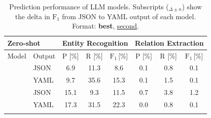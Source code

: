 



\begin{table}[tb]
  \centering
  \caption[Prediction performance of LLM models]{Prediction performance of LLM models. Subscripts (${}_{\Delta\pm n}$) show the delta in $\text{F}_1$ from JSON to YAML output of each model. Format: \textbf{best}, \underline{second}.}
  \label{tab:llmeval}
  \begin{tabular}{ll|ccc|ccc}
    \hline
    \multicolumn{2}{l|}{\textbf{Zero-shot}} &
    \multicolumn{3}{c|}{Entity Recognition} &
    \multicolumn{3}{c}{Relation Extraction} \\
    \hline
    Model & Output & P [\%] & R [\%] & $\text{F}_1$\,[\%] &
                     P [\%] & R [\%] & $\text{F}_1$\,[\%] \\
    \hline

    \arrayrulecolor{lightgrey}\cline{1-2}\arrayrulecolor{black}
    \multirow{2}{*}{WizardLM} &
    JSON & 6.9 & 11.3 & 8.6
              & 0.1 & 0.8 & 0.1 \\
    \ & YAML & 9.7 & 35.6 &
    \hphantom{${}_{\Delta\text{+6.7}}$}
    15.3{\color{parametergreen}{${}_{\Delta\text{+6.7}}$}}
              & 0.1 & 1.5 &
    \hphantom{${}_{\Delta\text{+0.0}}$}
    0.1{\color{contextgrey}{${}_{\Delta\text{+0.0}}$}}  \\
    \arrayrulecolor{lightgrey}\cline{1-2}\arrayrulecolor{black}

    \multirow{2}{*}{Vicuna${}_{4k}$} &
    JSON & 15.1 & 9.3 & 11.5
              & 0.7 & 3.8 & 1.2 \\
    \ & YAML & 17.3 & 31.5 &
    \hphantom{${}_{\Delta\text{+10.8}}$}
    22.3{\color{parametergreen}{${}_{\Delta\text{+10.8}}$}}
              & 0.0 & 0.8 &
    \hphantom{${}_{\Delta\text{-1.1}}$}
    0.1{\color{valuered}{${}_{\Delta\text{-1.1}}$}}  \\
    \arrayrulecolor{lightgrey}\cline{1-2}\arrayrulecolor{black}


\end{tabular}
\end{table}

